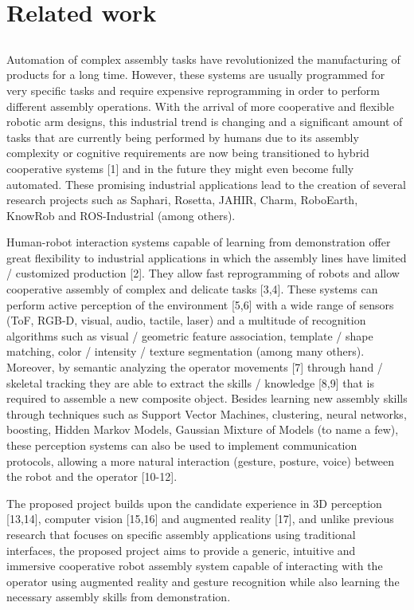 \chapter{Related work}\label{chap:related-work}

\section*{}

Automation of complex assembly tasks have revolutionized the manufacturing of products for a long time. However, these systems are usually programmed for very specific tasks and require expensive reprogramming in order to perform different assembly operations. With the arrival of more cooperative and flexible robotic arm designs, this industrial trend is changing and a significant amount of tasks that are currently being performed by humans due to its assembly complexity or cognitive requirements are now being transitioned to hybrid cooperative systems [1] and in the future they might even become fully automated. These promising industrial applications lead to the creation of several research projects such as Saphari, Rosetta, JAHIR, Charm, RoboEarth, KnowRob and ROS-Industrial (among others).

Human-robot interaction systems capable of learning from demonstration offer great flexibility to industrial applications in which the assembly lines have limited / customized production [2]. They allow fast reprogramming of robots and allow cooperative assembly of complex and delicate tasks [3,4]. These systems can perform active perception of the environment [5,6] with a wide range of sensors (ToF, RGB-D, visual, audio, tactile, laser) and a multitude of recognition algorithms such as visual / geometric feature association, template / shape matching, color / intensity / texture segmentation (among many others). Moreover, by semantic analyzing the operator movements [7] through hand / skeletal tracking they are able to extract the skills / knowledge [8,9] that is required to assemble a new composite object. Besides learning new assembly skills through techniques such as Support Vector Machines, clustering, neural networks, boosting, Hidden Markov Models, Gaussian Mixture of Models (to name a few), these perception systems can also be used to implement communication protocols, allowing a more natural interaction (gesture, posture, voice) between the robot and the operator [10-12].

The proposed project builds upon the candidate experience in 3D perception [13,14], computer vision [15,16] and augmented reality [17], and unlike previous research that focuses on specific assembly applications using traditional interfaces, the proposed project aims to provide a generic, intuitive and immersive cooperative robot assembly system capable of interacting with the operator using augmented reality and gesture recognition while also learning the necessary assembly skills from demonstration.
